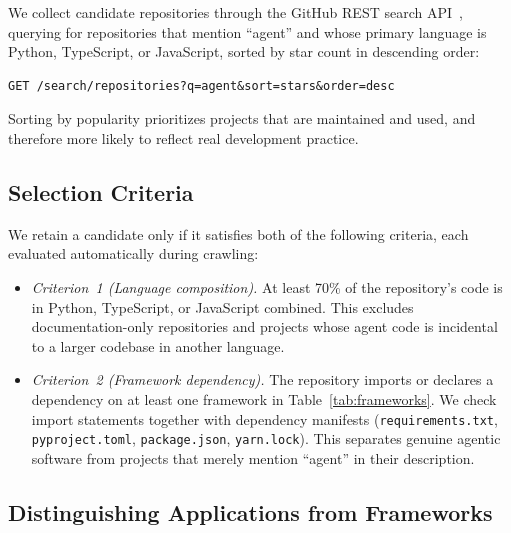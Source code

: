 We collect candidate repositories through the GitHub REST search API~\cite{github-rest-api}, querying for repositories that mention ``agent'' and whose primary language is Python, TypeScript, or JavaScript, sorted by star count in descending order:
 
\begin{scriptsize}
\begin{verbatim}
GET /search/repositories?q=agent&sort=stars&order=desc
\end{verbatim}
\end{scriptsize}

Sorting by popularity prioritizes projects that are maintained and used, and therefore more likely to reflect real development practice. 

\subsection{Selection Criteria}

We retain a candidate only if it satisfies both of the following criteria, each evaluated automatically during crawling:
 
\begin{itemize}
\item \emph{Criterion~1 (Language composition).} At least 70\% of the repository's code is in Python, TypeScript, or JavaScript combined. This excludes documentation-only repositories and projects whose agent code is incidental to a larger codebase in another language.
\item \emph{Criterion~2 (Framework dependency).} The repository imports or declares a dependency on at least one framework in Table~\ref{tab:frameworks}. We check import statements together with dependency manifests (\texttt{requirements.txt}, \texttt{pyproject.toml}, \texttt{package.json}, \texttt{yarn.lock}). This separates genuine agentic software from projects that merely mention ``agent'' in their description.
\end{itemize}

\subsection{Distinguishing Applications from Frameworks}

